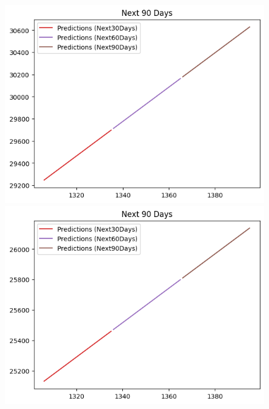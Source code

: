 \begin{figure}[H]
\begin{minipage}{0.15\textwidth}
    \includegraphics[width=1\textwidth]{resources/chapter-5/newdata1/predicted/EIB_LinearRegression_7-3_90Days.png}
    \end{minipage}
    \hfill
    \begin{minipage}{0.15\textwidth}
    \centering
    \includegraphics[width=1\textwidth]{resources/chapter-5/newdata1/predicted/EIB_LinearRegression_8-2_90Days.png}
    \end{minipage}
    \hfill
        \begin{minipage}{0.15\textwidth}
    \centering

\end{minipage}
\end{figure}
